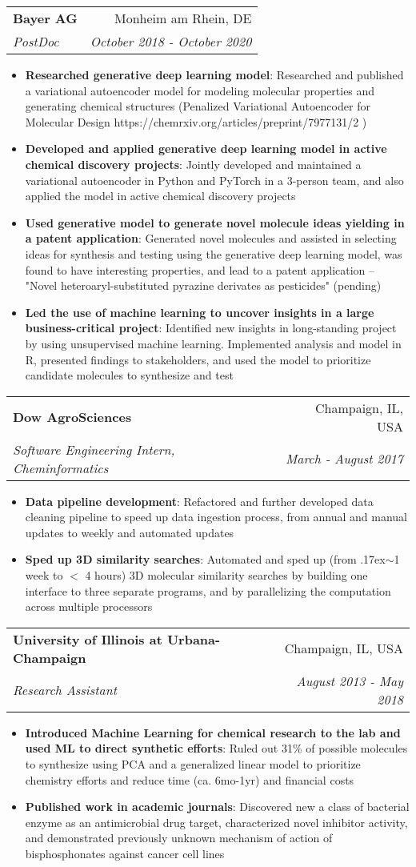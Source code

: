 \documentclass[letterpaper,hidelinks,11pt]{article}
\makeatletter
\newcommand{\resumeItem}[2]{
  \item\small{
    \textbf{#1}{: #2 \vspace{-2pt}}
  }
}
\newcommand{\resumeSubheading}[4]{
  \vspace{-1pt}\item
    \begin{tabular*}{0.97\textwidth}{l@{\extracolsep{\fill}}r}
      \textbf{#1} & #2 \\
      \textit{\small#3} & \textit{\small #4} \\
    \end{tabular*}\vspace{-5pt}
}
\newcommand{\resumeItemListStart}{\begin{itemize}}
\newcommand{\resumeItemListEnd}{\end{itemize}\vspace{-5pt}}
\makeatother
\begin{document}
 \resumeSubheading
 {Bayer AG}{Monheim am Rhein, DE}
 {PostDoc}{October 2018 - October 2020}
  \resumeItemListStart
  	\resumeItem{Researched generative deep learning model}
	{Researched and published a variational autoencoder model for modeling molecular properties and generating chemical structures (Penalized Variational Autoencoder for Molecular Design https://chemrxiv.org/articles/preprint/7977131/2 )}
	\resumeItem{Developed and applied generative deep learning model in active chemical discovery projects}
	{Jointly developed and maintained a variational autoencoder in Python and PyTorch in a 3-person team, and also applied the model in active chemical discovery projects}
	\resumeItem{Used generative model to generate novel molecule ideas yielding in a patent application}
		{Generated novel molecules and assisted in selecting ideas for synthesis and testing using the generative deep learning model, was found to have interesting properties, and lead to a patent application -- "Novel heteroaryl-substituted pyrazine derivates as pesticides" (pending)}
	\resumeItem{Led the use of machine learning to uncover insights in a large business-critical project}
		{Identified new insights in long-standing project by using unsupervised machine learning. Implemented analysis and model in R, presented findings to stakeholders, and used the model to prioritize candidate molecules to synthesize and test}
  \resumeItemListEnd

    \resumeSubheading
      {Dow AgroSciences }{Champaign, IL, USA}
      {Software Engineering Intern, Cheminformatics}{March - August 2017}
      \resumeItemListStart
        \resumeItem{Data pipeline development}
          {Refactored and further developed data cleaning pipeline to speed up data ingestion process, from annual and manual updates to weekly and automated updates}
        \resumeItem{Sped up 3D similarity searches}
          {Automated and sped up (from {\raise.17ex\hbox{$\scriptstyle\mathtt{\sim}$}}1 week to $<$ 4 hours) 3D molecular similarity searches by building one interface to three separate programs, and by parallelizing the computation across multiple processors}
        \resumeItemListEnd

    \resumeSubheading
        {University of Illinois at Urbana-Champaign }{Champaign, IL, USA}
        {Research Assistant}{August 2013 - May 2018}
        \resumeItemListStart
          \resumeItem{Introduced Machine Learning for chemical research to the lab and used ML to direct synthetic efforts}
            {Ruled out 31\% of possible molecules to synthesize using PCA and a generalized linear model to prioritize chemistry efforts and reduce time (ca. 6mo-1yr) and financial costs }
          \resumeItem{Published work in academic journals}
            {Discovered new a class of bacterial enzyme as an antimicrobial drug target, characterized novel inhibitor activity, and demonstrated previously unknown mechanism of action of bisphosphonates against cancer cell lines}
        \resumeItemListEnd
\end{document}

